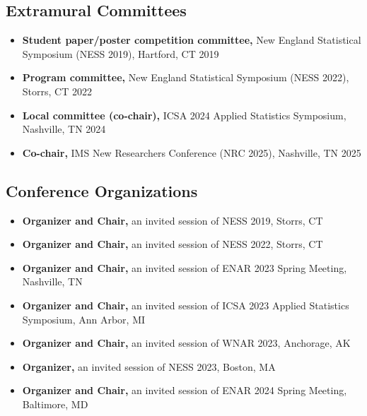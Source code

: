 \documentclass[12pt]{article}
\begin{document}
	\subsection*{Extramural Committees}
	\begin{itemize}
		\item {\bf Student paper/poster competition committee,} New 
		England Statistical Symposium (NESS 2019), Hartford, CT 
		\hfill 2019
		\item {\bf Program committee,} New England Statistical 
		Symposium (NESS 2022), Storrs, CT \hfill 2022
		\item {\bf Local committee (co-chair),} ICSA 2024 Applied 
		Statistics Symposium, Nashville, TN \hfill \mbox{2024}
		\item {\bf Co-chair,} IMS New Researchers Conference (NRC 
		2025), Nashville, TN \hfill 2025
	\end{itemize}
	
	\subsection*{Conference Organizations}
	\begin{itemize}
		\item {\bf Organizer and Chair,} an invited session of NESS 
		2019, Storrs, CT
		\item {\bf Organizer and Chair,} an invited session of NESS 
		2022, Storrs, CT
		\item {\bf Organizer and Chair,} an invited session of ENAR 
		2023 Spring Meeting, Nashville, TN
		\item {\bf Organizer and Chair,} an invited session of ICSA 
		2023 Applied Statistics Symposium, Ann Arbor, MI
		\item {\bf Organizer and Chair,} an invited session of WNAR 
		2023, Anchorage, AK
		\item {\bf Organizer,} an invited session of NESS 2023, 
		Boston, MA
		\item {\bf Organizer and Chair,} an invited session of ENAR 
		2024 Spring Meeting, Baltimore, MD
	\end{itemize}
	
	
\end{document}

